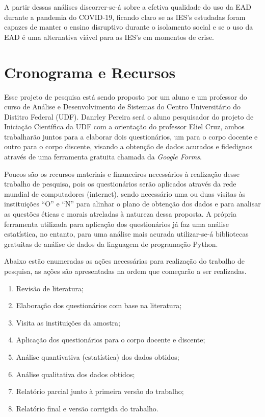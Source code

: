 \documentclass[
	arial,
	12pt,				%
	openright,			%
	oneside,
	a4paper,			%
	chapter=TITLE,		%
	english,			%
	french,				%
	spanish,			%
	brazil,				%
	]{abntex2}
\begin{document}
A partir dessas análises discorrer-se-á sobre a efetiva qualidade do uso da EAD durante a pandemia do COVID-19, ficando claro se as IES's estudadas foram capazes de manter o ensino disruptivo durante o isolamento social e se o uso da EAD é uma alternativa viável para as IES's em momentos de crise.

\chapter{Cronograma  e Recursos}

Esse projeto de pesquisa está sendo proposto por um aluno e um professor do curso de Análise e Desenvolvimento de Sistemas do Centro Universitário do Distitro Federal (UDF). Danrley Pereira será o aluno pesquisador do projeto de Iniciação Científica da UDF com a orientação do professor Eliel Cruz, ambos trabalharão juntos para a elaborar dois questionários, um para o corpo docente e outro para o corpo discente, visando a obtenção de dados acurados e fidedignos através de uma ferramenta gratuita chamada da \textit{Google Forms}.

Poucos são os recursos materiais e financeiros necessários à realização desse trabalho de pesquisa, pois os questionários serão aplicados através da rede mundial de computadores (internet), sendo necessário uma ou duas visitas às instituições ``O'' e ``N'' para alinhar o plano de obtenção dos dados e para analisar as questões éticas e morais atreladas à natureza dessa proposta. A própria ferramenta utilizada para aplicação dos questionários já faz uma análise estatística, no entanto, para uma análise mais acurada utilizar-se-á bibliotecas gratuitas de análise de dados da linguagem de programação Python. 

 Abaixo estão enumeradas as ações necessárias para realização do trabalho de pesquisa, as ações são apresentadas na ordem que começarão a ser realizadas.

\begin{enumerate}
	\item \label{rev-lit} Revisão de literatura;
	\item \label{ela-quest} Elaboração dos questionários com base na literatura;
	\item \label{vis-inst}  Visita as instituições da amostra;
	\item \label{aplic-quest} Aplicação dos questionários para o corpo docente e discente;
	\item \label{anI} Análise quantivativa (estatística) dos dados obtidos;
	\item \label{anII} Análise qualitativa dos dados obtidos;
	\item \label{rp} Relatório parcial junto à primeira versão do trabalho;
	\item \label{pf} Relatório final e versão corrigida do trabalho.
\end{enumerate}
\end{document}
